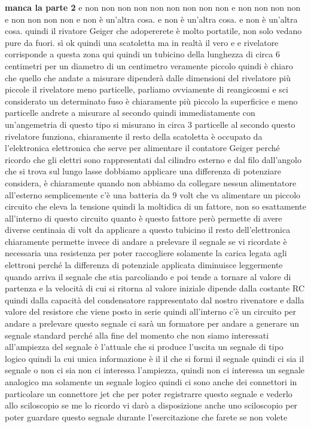 \textbf{manca la parte 2}
e non non non non non non non non non e non non non non e non non non non e non è un'altra cosa. e non è un'altra cosa. e non è un'altra cosa. quindi il rivatore Geiger che adopererete è molto portatile, non solo vedano pure da fuori. sì ok quindi una scatoletta ma in realtà il vero e e rivelatore corrisponde a questa zona qui quindi un tubicino della lunghezza di circa 6 centimetri per un diametro di un centimetro veramente piccolo quindi è chiaro che quello che andate a misurare dipenderà dalle dimensioni del rivelatore più piccole il rivelatore meno particelle, parliamo ovviamente di reangicosmi e sci considerato un determinato fuso è chiaramente più piccolo la superficice e meno particelle andrete a misurare al secondo quindi immediatamente con un'angemetria di questo tipo si misurano in circa 3 particelle al secondo questo rivelatore funziona, chiaramente il resto della scatoletta è occupato da l'elektronica elettronica che serve per alimentare il contatore Geiger perché ricordo che gli elettri sono rappresentati dal cilindro esterno e dal filo dall'angolo che si trova sul lungo lasse dobbiamo applicare una differenza di potenziare considera, è chiaramente quando non abbiamo da collegare nessun alimentatore all'esterno semplicemente c'è una batteria da 9 volt che va alimentare un piccolo circuito che eleva la tensione quindi la moltidica di un fattore, non so esattamente all'interno di questo circuito quanto è questo fattore però permette di avere diverse centinaia di volt da applicare a questo tubicino il resto dell'elettronica chiaramente permette invece di andare a prelevare il segnale se vi ricordate è necessaria una resistenza per poter raccogliere solamente la carica legata agli elettroni perché la differenza di potenziale applicata diminuisce leggermente quando arriva il segnale che stia parcoliando e poi tende a tornare al valore di partenza e la velocità di cui si ritorna al valore iniziale dipende dalla costante RC quindi dalla capacità del condensatore rappresentato dal nostro rivenatore e dalla valore del resistore che viene posto in serie quindi all'interno c'è un circuito per andare a prelevare questo segnale ci sarà un formatore per andare a generare un segnale standard perché alla fine del momento che non siamo interessati all'ampiezza del segnale è l'attuale che si produce l'uscita un segnale di tipo logico quindi la cui unica informazione è il il che si formi il segnale quindi ci sia il segnale o non ci sia non ci interessa l'ampiezza, quindi non ci interessa un segnale analogico ma solamente un segnale logico quindi ci sono anche dei connettori in particolare un connettore jet che per poter registrarre questo segnale e vederlo allo sciloscopio se me lo ricordo vi darò a disposizione anche uno sciloscopio per poter guardare questo segnale durante l'esercitazione che farete se non volete 

